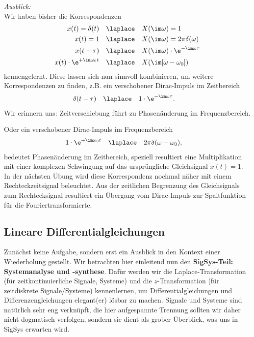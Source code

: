 \begin{mdframed}
\textit{Ausblick:}
%
\\\noindent
Wir haben bisher die Korrespondenzen
\begin{align}
x(t)= \delta(t) &\quad \laplace \quad X(\im\omega)=1\\
x(t)= 1 &\quad \laplace \quad X(\im\omega)=2\pi \delta(\omega)\\
x(t - \tau) & \quad \laplace \quad X(\im\omega) \cdot \e^{-\im\omega \tau}\\
x(t) \cdot \e^{+\im\omega_0 t} & \quad \laplace \quad X(\im[\omega-\omega_0])
\end{align}
kennengelernt.
%
Diese lassen sich nun sinnvoll kombinieren, um weitere Korrespondenzen zu finden,
z.B. ein verschobener Dirac-Impuls im Zeitbereich
\begin{align}
\delta(t-\tau)& \quad \laplace \quad 1 \cdot \e^{-\im\omega \tau}.
\end{align}
Wir erinnern uns: Zeitverschiebung führt zu Phasenänderung im Frequenzbereich.

Oder ein verschobener Dirac-Impuls im Frequenzbereich
\begin{align}
1 \cdot \e^{+\im\omega_0 t} & \quad \laplace \quad 2\pi\delta(\omega-\omega_0),
\end{align}
bedeutet Phasenänderung im Zeitbereich, speziell resultiert eine Multiplikation
mit einer komplexen Schwingung auf das ursprüngliche Gleichsignal $x(t)=1$.
%
In der nächsten Übung wird diese Korrespondenz nochmal näher mit einem
Rechteckzeitsignal beleuchtet. Aus der zeitlichen Begrenzung des Gleichsignals
zum Rechtecksignal resultiert ein Übergang vom Dirac-Impuls zur Spaltfunktion
für die Fouriertransformierte.
\end{mdframed}














\newpage
\subsection{Lineare Differentialgleichungen}
\label{sec:A7BEE9E24E}
%
Zunächst keine Aufgabe, sondern erst ein Ausblick in den Kontext einer Wiederholung
gestellt.
Wir betrachten hier einleitend nun den \textbf{SigSys-Teil: Systemanalyse und -synthese}.
Dafür werden wir die Laplace-Transformation (für zeitkontinuierliche Signale, Systeme)
und die $z$-Transformation (für zeitdiskrete Signale/Systeme) kennenlernen, um
Differentialgleichungen und Differenzengleichungen elegant(er) lösbar zu machen.
%
Signale und Systeme sind natürlich sehr eng verknüpft, die hier aufgespannte
Trennung sollten wir daher nicht dogmatisch verfolgen, sondern sie dient als grober
Überblick, was uns in SigSys erwarten wird.

